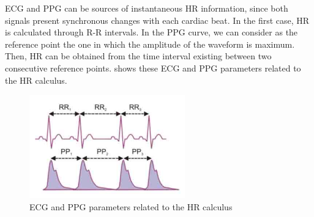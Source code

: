 ECG and PPG can be sources of instantaneous HR information, since both
signals present synchronous changes with each cardiac beat. In the
first case, HR is calculated through R-R intervals. In the PPG curve,
we can consider as the reference point the one in which the amplitude
of the waveform is maximum. Then, HR can be obtained from the time
interval existing between two consecutive reference
points.  shows these ECG and PPG parameters related
to the HR calculus.


\begin{figure}[!ht]
\centering
\includegraphics[width=0.6\textwidth]{images/PPGandECG.jpg}
\caption{ECG and PPG parameters related to the HR calculus}
\label{fig:HRcalculus}
\end{figure}






